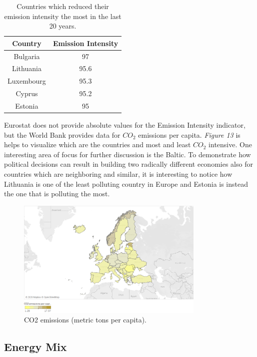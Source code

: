 \documentclass{book}
\begin{document}
\bigskip
\begin{table}[H]
\begin{center}
\begin{tabular}{|c|c|}
\hline
Country & Emission Intensity \\
\hline
Bulgaria & 97\\
Lithuania & 95.6\\
Luxembourg & 95.3\\
Cyprus & 95.2\\
Estonia & 95\\
\hline
\end{tabular}
\caption{Countries which reduced their emission intensity the most in the last 20 years.}
\end{center}
\end{table}

Eurostat does not provide absolute values for the Emission Intensity indicator, but the World Bank provides data for $CO_{2}$ emissions per capita. \textit{Figure 13} is helps to visualize which are the countries and most and least $CO_{2}$ intensive. One interesting area of focus for further discussion is the Baltic. To demonstrate how political decisions can result in building two radically different economies also for countries which are neighboring and similar, it is interesting to notice how Lithuania is one of the least polluting country in Europe and Estonia is instead the one that is polluting the most.

\bigskip
\begin{figure}[H]
\begin{center}
\captionsetup{justification=centering}
\includegraphics[width=0.8\textwidth]{Images/intensiti.png}
\caption{CO2 emissions (metric tons per capita). }
\end{center}
\end{figure}
\bigskip

\subsection*{Energy Mix}
\end{document}
